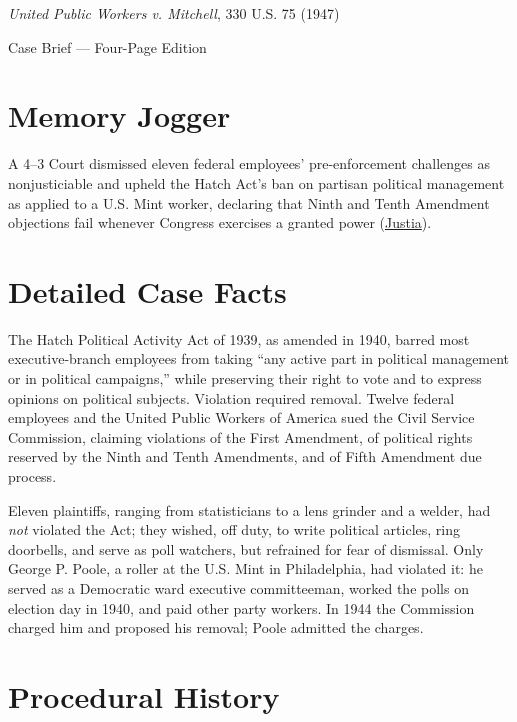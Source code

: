 \documentclass[12pt]{article}
\begin{document}
\begin{center}
{\LARGE \textit{United Public Workers v. Mitchell}, 330 U.S. 75 (1947)\par}
\vspace{0.8em}
{\large Case Brief --- Four-Page Edition\par}
\end{center}
\vspace{1em}

\section{Memory Jogger}

A 4--3 Court dismissed eleven federal employees' pre-enforcement challenges as nonjusticiable and upheld the Hatch Act's ban on partisan political management as applied to a U.S. Mint worker, declaring that Ninth and Tenth Amendment objections fail whenever Congress exercises a granted power (\href{https://supreme.justia.com/cases/federal/us/330/75/}{Justia}).

\section{Detailed Case Facts}

The Hatch Political Activity Act of 1939, as amended in 1940, barred most executive-branch employees from taking ``any active part in political management or in political campaigns,'' while preserving their right to vote and to express opinions on political subjects. Violation required removal. Twelve federal employees and the United Public Workers of America sued the Civil Service Commission, claiming violations of the First Amendment, of political rights reserved by the Ninth and Tenth Amendments, and of Fifth Amendment due process.

Eleven plaintiffs, ranging from statisticians to a lens grinder and a welder, had \emph{not} violated the Act; they wished, off duty, to write political articles, ring doorbells, and serve as poll watchers, but refrained for fear of dismissal. Only George P. Poole, a roller at the U.S. Mint in Philadelphia, had violated it: he served as a Democratic ward executive committeeman, worked the polls on election day in 1940, and paid other party workers. In 1944 the Commission charged him and proposed his removal; Poole admitted the charges.

\section{Procedural History}
\end{document}
